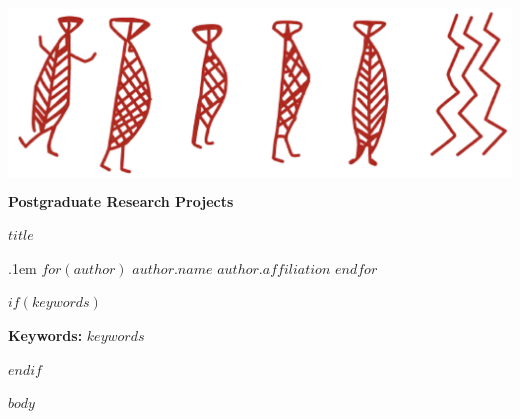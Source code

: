 \documentclass[12pt,a4paper]{article}
\newcommand{\titlesize}{\fontsize{22.0}{20pt}\selectfont}
\begin{document}
\begin{sf}
\begin{center}
\includegraphics[height=50mm]{MM_Head}\\
\titlesize\textbf{Postgraduate Research Projects} \par
\end{center}
{\raggedright %
\begin{minipage}[t]{170mm}
  \vskip 2.5pt%
{\raggedright\large\textbf{$title$} \par}
    \end{minipage}

{\par\large%
      \vspace*{5mm}
      \lineskip .1em%
$for(author)$
                               \textbf{$author.name$} \hskip 15pt \emph{\small $author.affiliation$}      \vskip 5pt 
 $endfor$
     \vskip 10pt%
         {\noindent\usebox\absbox\par}
         
 $if(keywords)$
    {\vspace{1pt}%
      {\noindent\normalsize \textbf{Keywords:} $keywords$ }\par}
      \vspace{1mm}
      \par%
$endif$    
 
 
 
  }}
\end{sf}



 
 $body$
\end{document}
